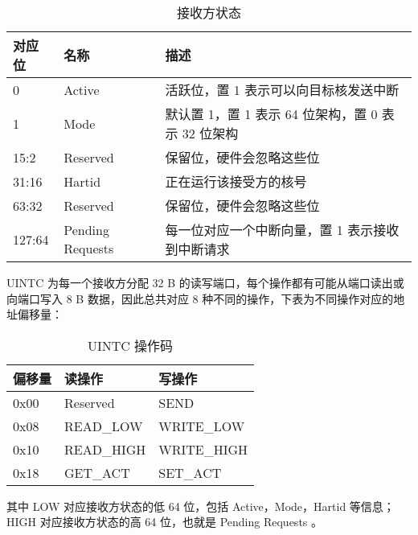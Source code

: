 \begin{table}
    \centering
    \begin{threeparttable}[c]
        \label{tab:three-part-table-3}
        \begin{tabular}{|l|l|l|}
            \hline
            对应位 & 名称 & 描述 \\
            \hline
            0 & Active & 活跃位，置 1 表示可以向目标核发送中断 \\
            \hline
            1 & Mode & 默认置 1，置 1 表示 64 位架构，置 0 表示 32 位架构 \\
            \hline
            15:2 & Reserved & 保留位，硬件会忽略这些位 \\
            \hline
            31:16 & Hartid & 正在运行该接受方的核号 \\
            \hline
            63:32 & Reserved & 保留位，硬件会忽略这些位 \\
            \hline
            127:64 & Pending Requests & 每一位对应一个中断向量，置 1 表示接收到中断请求 \\
            \hline
        \end{tabular}
        \caption{接收方状态}
    \end{threeparttable}
\end{table}

UINTC 为每一个接收方分配 32 B 的读写端口，每个操作都有可能从端口读出或向端口写入 8 B 数据，因此总共对应 8 种不同的操作，下表为不同操作对应的地址偏移量：

\begin{table}
    \centering
    \begin{threeparttable}[c]
        \label{tab:three-part-table-4}
        \begin{tabular}{|l|l|l|}
            \hline
            偏移量 & 读操作 & 写操作 \\
            \hline
            0x00 & Reserved & SEND \\
            \hline
            0x08 & READ\_LOW & WRITE\_LOW \\
            \hline
            0x10 & READ\_HIGH & WRITE\_HIGH \\
            \hline
            0x18 & GET\_ACT & SET\_ACT \\
            \hline
        \end{tabular}
        \caption{UINTC 操作码}
    \end{threeparttable}
\end{table}

其中 LOW 对应接收方状态的低 64 位，包括 Active，Mode，Hartid 等信息；HIGH 对应接收方状态的高 64 位，也就是 Pending Requests 。

